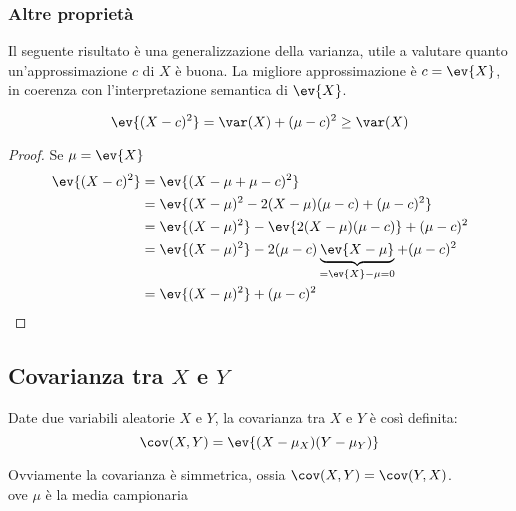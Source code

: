 \subsubsection{Altre proprietà}
Il seguente risultato è una generalizzazione della varianza, utile a valutare quanto un'approssimazione $c$ di $X$ è buona. La migliore approssimazione è $c=\ev{X}$, in coerenza con l'interpretazione semantica di $\ev{X}$.
\begin{prop}
	\begin{equation*}
		\ev{(X-c)^2}=\var(X)+(\mu-c)^2\geq\var(X)
	\end{equation*}
\end{prop}
\begin{proof}
	Se $\mu=\ev{X}$
	\begin{align*}
		\ev{(X-c)^2} & = \ev{(X-\mu+\mu-c)^2}                                                     \\
		             & = \ev{(X-\mu)^2-2(X-\mu)(\mu-c)+(\mu-c)^2}                                 \\
		             & = \ev{(X-\mu)^2}-\ev{2(X-\mu)(\mu-c)}+(\mu-c)^2                            \\
		             & = \ev{(X-\mu)^2}-2(\mu-c)\underbrace{\ev{X-\mu}}_{=\ev{X}-\mu=0}+(\mu-c)^2 \\
		             & = \ev{(X-\mu)^2}+(\mu-c)^2
	\end{align*}
\end{proof}



\subsection{Covarianza tra $X$ e $Y$}

\begin{defin}
	Date due variabili aleatorie $X$ e $Y$, la covarianza tra $X$ e $Y$ è così definita:
	\begin{equation} \label{eq:covar}
		\cov(X,Y)=\ev{(X-\mu_X)(Y-\mu_Y)}
	\end{equation}
\end{defin}

\noindent
Ovviamente la covarianza è simmetrica, ossia $\cov(X,Y)=\cov(Y,X)$.\\
\footnotesize{}ove $\mu$ è la media campionaria
\normalsize

